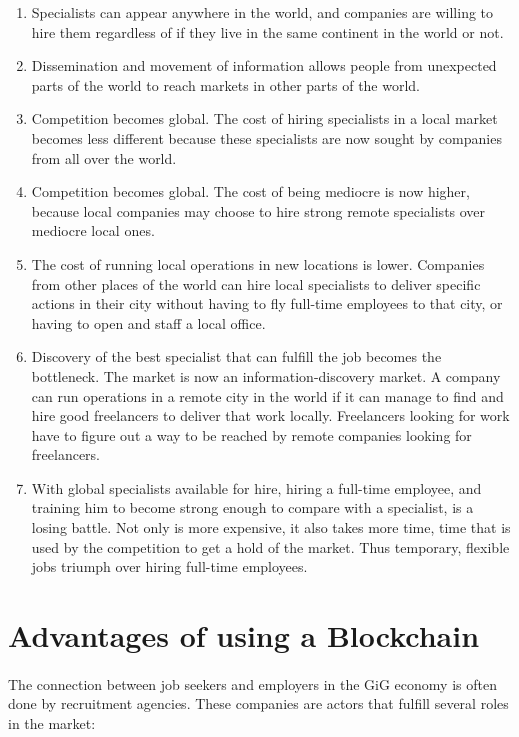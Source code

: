 \documentclass{article}
\begin{document}
\begin{enumerate}
  \item Specialists can appear anywhere in the world, and companies are willing to hire them regardless of if they live in the same continent in the world or not.
  \item Dissemination and movement of information allows people from unexpected parts of the world to reach markets in other parts of the world.
  \item Competition becomes global. The cost of hiring specialists in a local market becomes less different because these specialists are now sought by companies from all over the world.
  \item Competition becomes global. The cost of being mediocre is now higher, because local companies may choose to hire strong remote specialists over mediocre local ones.
  \item The cost of running local operations in new locations is lower. Companies from other places of the world can hire local specialists to deliver specific actions in their city without having to fly full-time employees to that city, or having to open and staff a local office.
  \item Discovery of the best specialist that can fulfill the job becomes the bottleneck. The market is now an information-discovery market. A company can run operations in a remote city in the world if it can manage to find and hire good freelancers to deliver that work locally. Freelancers looking for work have to figure out a way to be reached by remote companies looking for freelancers.
  \item With global specialists available for hire, hiring a full-time employee, and training him to become strong enough to compare with a specialist, is a losing battle. Not only is more expensive, it also takes more time, time that is used by the competition to get a hold of the market. Thus temporary, flexible jobs triumph over hiring full-time employees.

\end{enumerate}

\newpage

\section{Advantages of using a Blockchain}

\paragraph{} The connection between job seekers and employers in the GiG economy is often done by recruitment agencies. These companies are actors that fulfill several roles in the market:
\end{document}
